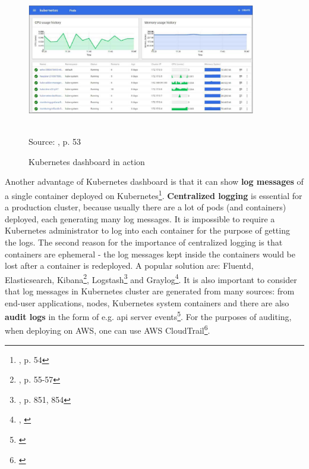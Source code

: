 \begin{figure}[H]
  \centering
  \includegraphics[width=10cm]{figures/k8s-dashboard.png}
  \label{fig:grafana}
  \caption{Kubernetes dashboard in action}
  \\
  \tiny{Source: \cite{book-mastering-k8s}, p. 53}
\end{figure}

Another advantage of Kubernetes dashboard is that it can show \textbf{log messages} of a single container deployed on Kubernetes\footnote{\cite{book-mastering-k8s}, p. 54}. \textbf{Centralized logging} is essential for a production cluster, because usually there are a lot of pods (and containers) deployed, each generating many log messages. It is impossible to require a Kubernetes administrator to log into each container for the purpose of getting the logs. The second reason for the importance of centralized logging is that containers are ephemeral - the log messages kept inside the containers would be lost after a container is redeployed. A popular solution are: Fluentd, Elasticsearch, Kibana\footnote{\cite{book-mastering-k8s}, p. 55-57}, Logstash\footnote{\cite{book-devops-k8s}, p. 851, 854} and Graylog\footnote{\cite{online-prod-year-k8s}, \cite{online-graylog}}. It is also important to consider that log messages in Kubernetes cluster are generated from many sources: from end-user applications, nodes, Kubernetes system containers and there are also \textbf{audit logs} in the form of e.g. api server events\footnote{\cite{online-graylog-art}}. For the purposes of auditing, when deploying on AWS, one can use AWS CloudTrail\footnote{\cite{online-ct}}.

